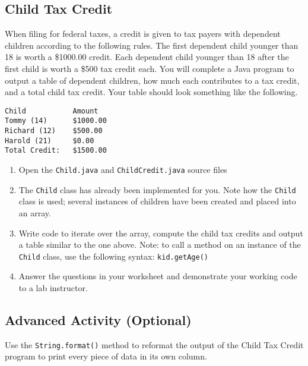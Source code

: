 \documentclass[12pt]{scrartcl}
\begin{document}
\subsection*{Child Tax Credit}

When filing for federal taxes, a credit is given to tax payers 
with dependent children according to the following rules.  The 
first dependent child younger than 18 is worth a \$1000.00 credit.  
Each dependent child younger than 18 after the first child is 
worth a \$500 tax credit each.  You will complete a Java program
to output a table of dependent children, how much each contributes 
to a tax credit, and a total child tax credit.  Your table should 
look something like the following.

\begin{verbatim}
Child           Amount
Tommy (14)      $1000.00
Richard (12)    $500.00
Harold (21)     $0.00
Total Credit:   $1500.00
\end{verbatim}

\begin{enumerate}
  \item Open the \texttt{Child.java} and 
  	\texttt{ChildCredit.java} source files
  \item The \texttt{Child} class has already been implemented
  	for you. Note how the \texttt{Child} class is used; several 
	instances of children have been created and placed into an array.
  \item Write code to iterate over the array, compute the child tax 
	credits and output a table similar to the one above.  Note: to 
	call a method on an instance of the \texttt{Child} class, 
	use the following syntax: \texttt{kid.getAge()}
  \item Answer the questions in your worksheet and demonstrate your 
  	working code to a lab instructor.
\end{enumerate}

\subsection*{Advanced Activity (Optional)}

Use the \texttt{String.format()} method to reformat the 
output of the Child Tax Credit program to print every piece of data 
in its own column.
\end{document}
